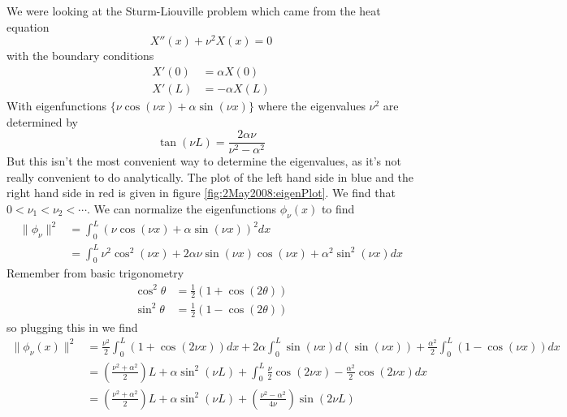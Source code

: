 We were looking at the Sturm-Liouville problem which came
from the heat equation
\begin{equation}
X''(x)+\nu^{2}X(x) = 0
\end{equation}
with the boundary conditions
\begin{subequations}
\begin{align}
X'(0) &= \alpha X(0)\\
X'(L) &= -\alpha X(L)
\end{align}
\end{subequations}
With eigenfunctions $\{\nu\cos(\nu x) + \alpha\sin(\nu x)\}$
where the eigenvalues $\nu^2$ are determined by
\begin{equation}\label{eqn:2May2008:eigenvalueRelationship}
\tan(\nu L) = \frac{2\alpha\nu}{\nu^2-\alpha^2}
\end{equation}
But this isn't the most convenient way to determine the
eigenvalues, as it's not really convenient to do
analytically. The plot of the left hand side in blue and the
right hand side in red is given in figure
\eqref{fig:2May2008:eigenPlot}. We find that
$0<\nu_1<\nu_2<\cdots$. We can normalize the eigenfunctions
$\phi_{\nu}(x)$ to find
\begin{subequations}
\begin{align}
\|\phi_{\nu}\|^{2} &= \int^{L}_{0} (\nu\cos(\nu x)+\alpha\sin(\nu x))^2dx\\
&=\int^{L}_{0} \nu^{2}\cos^{2}(\nu x) + 2\alpha\nu\sin(\nu x)\cos(\nu x) + \alpha^{2}\sin^{2}(\nu x)dx
\end{align}
\end{subequations}
Remember from basic trigonometry
\begin{align*}
\cos^{2}\theta &= \frac{1}{2}(1 + \cos(2\theta))\\
\sin^{2}\theta &= \frac{1}{2}(1 - \cos(2\theta))
\end{align*}
so plugging this in we find
\begin{subequations}
\begin{align}
\|\phi_{\nu}(x)\|^{2} &=
\frac{\nu^2}{2}\int^{L}_{0}(1+\cos(2\nu x))dx +2\alpha\int^{L}_{0}\sin(\nu x)d\left(\sin(\nu x)\right) +\frac{\alpha^2}{2}\int^{L}_{0}(1-\cos(\nu x))dx\\
&=\left(\frac{\nu^2+\alpha^2}{2}\right)L+\alpha\sin^{2}(\nu L)+\int^{L}_{0}\frac{\nu}{2}\cos(2\nu x)-\frac{\alpha^2}{2}\cos(2\nu x)dx\\
&=\left(\frac{\nu^2+\alpha^2}{2}\right)L+\alpha\sin^{2}(\nu L)+\left(\frac{\nu^2-\alpha^2}{4\nu}\right)\sin(2\nu L)
\end{align}
\end{subequations}
